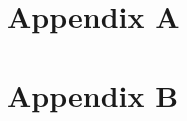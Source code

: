 \newpage
\section*{Appendix A}
\label{appB}


\clearpage
\newpage
\section*{\centering Appendix B}
\label{appC}

